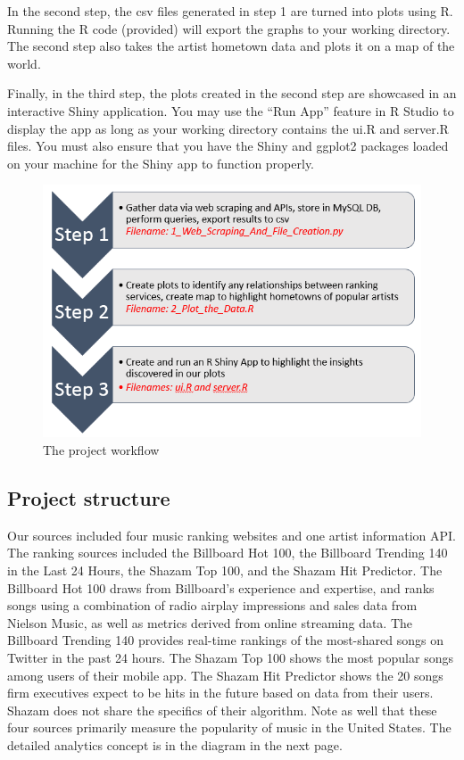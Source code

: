 \documentclass{article}
\begin{document}
\noindent
In the second step, the csv files generated in step 1 are turned into plots using R. Running the R code (provided) will export the graphs to your working directory. The second step also takes the artist hometown data and plots it on a map of the world. \vspace{2mm} 


\noindent
Finally, in the third step, the plots created in the second step are showcased in an interactive Shiny application. You may use the “Run App” feature in R Studio to display the app as long as your working directory contains the ui.R and server.R files. You must also ensure that you have the Shiny and ggplot2 packages loaded on your machine for the Shiny app to function properly. 
\vspace{5mm}
\begin{figure}[hb]
  \centering
    \includegraphics[scale=0.6]{Workflow}
  \caption{The project workflow}
\end{figure}

\subsection{Project structure}
Our sources included four music ranking websites and one artist information API. The ranking sources included the Billboard Hot 100, the Billboard Trending 140 in the Last 24 Hours, the Shazam Top 100, and the Shazam Hit Predictor. The Billboard Hot 100 draws from Billboard's experience and expertise, and ranks songs using a combination of radio airplay impressions and sales data from Nielson Music, as well as metrics derived from online streaming data. The Billboard Trending 140 provides real-time rankings of the most-shared songs on Twitter in the past 24 hours. The Shazam Top 100 shows the most popular songs among users of their mobile app. The Shazam Hit Predictor shows the 20 songs firm executives expect to be hits in the future based on data from their users. Shazam does not share the specifics of their algorithm. Note as well that these four sources primarily measure the popularity of music in the United States. The detailed analytics concept is in the diagram in the next page.\vspace{2mm}
\end{document}
